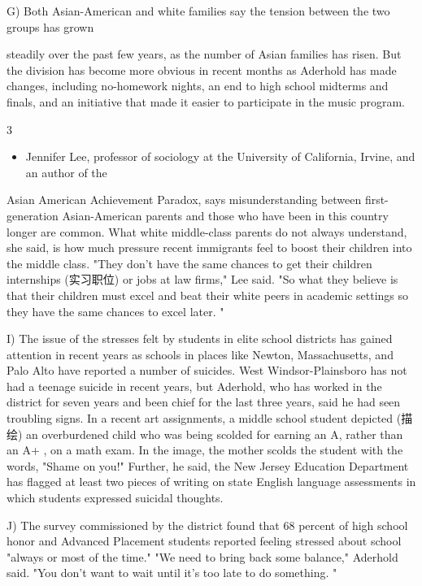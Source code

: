 \documentclass[UTF8,11pt]{ctexart}
\begin{document}
G) Both Asian-American and white families say the tension between the two groups has grown


steadily over the past few years, as the number of Asian families has risen. But the division has become more obvious in recent months as Aderhold has made changes, including no-homework nights, an end to high school midterms and finals, and an initiative that made it easier to participate in the music program.


3


\begin{itemize}[leftmargin=2em,itemsep=.2em,topsep=.4em]\item[H.] Jennifer Lee, professor of sociology at the University of California, Irvine, and an author of the
\end{itemize}

Asian American Achievement Paradox, says misunderstanding between first-generation Asian-American parents and those who have been in this country longer are common. What white middle-class parents do not always understand, she said, is how much pressure recent immigrants feel to boost their children into the middle class. "They don't have the same chances to get their children internships (实习职位) or jobs at law firms," Lee said. "So what they believe is that their children must excel and beat their white peers in academic settings so they have the same chances to excel later. "


I) The issue of the stresses felt by students in elite school districts has gained attention in recent years as schools in places like Newton, Massachusetts, and Palo Alto have reported a number of suicides. West Windsor-Plainsboro has not had a teenage suicide in recent years, but Aderhold, who has worked in the district for seven years and been chief for the last three years, said he had seen troubling signs. In a recent art assignments, a middle school student depicted (描绘) an overburdened child who was being scolded for earning an A, rather than an A+ , on a math exam. In the image, the mother scolds the student with the words, "Shame on you!" Further, he said, the New Jersey Education Department has flagged at least two pieces of writing on state English language assessments in which students expressed suicidal thoughts.


J) The survey commissioned by the district found that 68 percent of high school honor and Advanced Placement students reported feeling stressed about school "always or most of the time." "We need to bring back some balance," Aderhold said. "You don't want to wait until it's too late to do something. "
\end{document}
